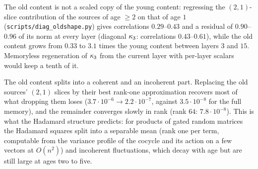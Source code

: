 The old content is not a scaled copy of the young content: regressing the $(2,1)$-slice contribution of the
sources of age $\ge2$ on that of age $1$ (\texttt{scripts/diag\_oldshape.py}) gives correlations $0.29$--$0.43$ and
a residual of $0.90$--$0.96$ of its norm at every layer (diagonal $\kappa_3$: correlations $0.43$--$0.61$), while the old
content grows from $0.33$ to $3.1$ times the young content between layers $3$ and $15$. Memoryless regeneration
of $\kappa_3$ from the current layer with per-layer scalars would keep a tenth of it.

The old content splits into a coherent and an incoherent part. Replacing the old sources' $(2,1)$ slices by their
best rank-one approximation recovers most of what dropping them loses ($3.7\cdot10^{-6}\to2.2\cdot10^{-7}$, against
$3.5\cdot10^{-8}$ for the full memory), and the remainder converges slowly in rank (rank $64$: $7.8\cdot10^{-8}$). This
is what the Hadamard structure predicts: for products of gated random matrices the Hadamard squares split into
a separable mean (rank one per term, computable from the variance profile of the cocycle and its action on a
few vectors at $O(n^2)$) and incoherent fluctuations, which decay with age but are still large at ages two to five.

